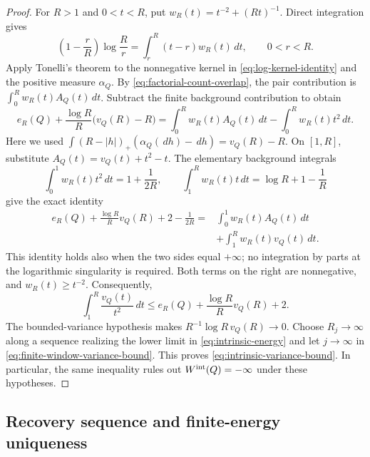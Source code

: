 \documentclass[11pt,reqno]{amsart}
\numberwithin{equation}{section}
\theoremstyle{definition}
\theoremstyle{remark}
\newcommand{\1}{\mathbf 1}
\newcommand{\dd}{\,d}
\begin{document}
\begin{proof}
For $R>1$ and $0<t<R$, put
$w_R(t)=t^{-2}+(Rt)^{-1}$. Direct integration gives
\begin{equation}\label{eq:log-kernel-identity}
\left(1-\frac rR\right)\log\frac Rr
 =\int_r^R(t-r)w_R(t)\dd t,
\qquad 0<r<R.
\end{equation}
Apply Tonelli's theorem to the nonnegative kernel in
\eqref{eq:log-kernel-identity} and the positive measure $\alpha_Q$.
By \eqref{eq:factorial-count-overlap}, the pair contribution is
$\int_0^R w_R(t)A_Q(t)\dd t$. Subtract the finite background
contribution to obtain
\[
e_R(Q)+\frac{\log R}{R}\bigl(v_Q(R)-R\bigr)
 =\int_0^R w_R(t)A_Q(t)\dd t
  -\int_0^R w_R(t)t^2\dd t.
\]
Here we used
$\int(R-|h|)_+(\alpha_Q(\dd h)-\dd h)=v_Q(R)-R$.
On $[1,R]$, substitute $A_Q(t)=v_Q(t)+t^2-t$.
The elementary background integrals
\[
\int_0^1w_R(t)t^2\dd t=1+\frac1{2R},\qquad
\int_1^Rw_R(t)t\dd t=\log R+1-\frac1R
\]
give the exact identity
\begin{equation}\label{eq:intrinsic-variance-identity}
\begin{split}
e_R(Q)+\frac{\log R}{R}v_Q(R)+2-\frac1{2R}
={}&\int_0^1w_R(t)A_Q(t)\dd t\\
 &+\int_1^Rw_R(t)v_Q(t)\dd t.
\end{split}
\end{equation}
This identity holds also when the two sides equal $+\infty$; no
integration by parts at the logarithmic singularity is required.
Both terms on the right are nonnegative, and $w_R(t)\ge t^{-2}$.
Consequently,
\begin{equation}\label{eq:finite-window-variance-bound}
\int_1^R\frac{v_Q(t)}{t^2}\dd t
\le e_R(Q)+\frac{\log R}{R}v_Q(R)+2.
\end{equation}
The bounded-variance hypothesis makes
$R^{-1}\log R\,v_Q(R)\to0$. Choose $R_j\to\infty$ along a
sequence realizing the lower limit in \eqref{eq:intrinsic-energy}
and let $j\to\infty$ in \eqref{eq:finite-window-variance-bound}.
This proves \eqref{eq:intrinsic-variance-bound}. In particular, the
same inequality rules out $W^{\rm int}(Q)=-\infty$ under these
hypotheses.
\end{proof}

\subsection{Recovery sequence and finite-energy uniqueness}
\end{document}
